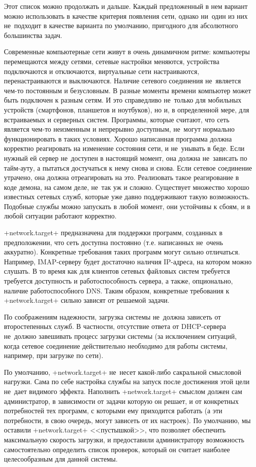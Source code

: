 \documentclass[10pt,oneside,a4paper]{article}
\begin{document}
Этот список можно продолжать и дальше. Каждый предложенный в нем вариант можно
использовать в качестве критерия появления сети, однако ни~один из них
не~подходит в качестве варианта по умолчанию, пригодного для абсолютного
большинства задач.

Современные компьютерные сети живут в очень динамичном ритме: компьютеры
перемещаются между сетями, сетевые настройки меняются, устройства подключаются и
отключаются, виртуальные сети настраиваются, перенастраиваются и выключаются.
Наличие сетевого соединения не~является чем-то постоянным и безусловным. В
разные моменты времени компьютер может быть подключен к разным сетям. И это
справедливо не~только для мобильных устройств (смартфонов, планшетов и
ноутбуков), но и, в определенной мере, для встраиваемых и серверных систем. 
Программы, которые считают, что сеть является чем-то неизменным и непрерывно
доступным, не~могут нормально функционировать в таких условиях. Хорошо
написанная программа должна корректно реагировать на изменение состояния сети, и
не~унывать в беде. Если нужный ей сервер не~доступен в настоящий момент, она
должна не~зависать по тайм-ауту, а пытаться достучаться к нему снова и снова.
Если сетевое соединение утрачено, она должна отреагировать на это. Реализовать
такое реагирование в коде демона, на самом деле, не~так уж и сложно. Существует
множество хорошо известных сетевых служб, которые уже давно поддерживают такую
возможность. Подобные службы можно запускать в любой момент, они устойчивы к
сбоям, и в любой ситуации работают корректно.

+network.target+ предназначена для поддержки программ, созданных в
предположении, что сеть доступна постоянно (т.е. написанных не~очень аккуратно).
Конкретные требования таких программ могут сильно отличаться. Например,
IMAP-серверу будет достаточно наличия IP-адреса, на котором можно слушать. В то
время как для клиентов сетевых файловых систем требуется требуется доступность и
работоспособность сервера, а также, опционально, наличие работоспособного DNS.
Таким образом, конкретные требования к +network.target+ сильно зависят от
решаемой задачи.

По соображениям надежности, загрузка системы не~должна зависеть от второстепенных
служб. В частности, отсутствие ответа от DHCP-сервера не~должно завешивать
процесс загрузки системы (за исключением ситуаций, когда сетевое соединение
действительно необходимо для работы системы, например, при загрузке по сети).

По умолчанию, +network.target+ не~несет какой-либо сакральной смысловой
нагрузки. Сама по себе настройка службы на запуск после достижения этой цели
не~дает видимого эффекта. Наполнить +network.target+ смыслом должен сам
администратор, в зависимости от задачи которую он решает, и от конкретных 
потребностей тех программ, с которыми ему приходится работать (а эти
потребности, в свою очередь, могут зависеть от их настроек). По умолчанию, мы
оставили +network.target+ <<пустышкой>>, что позволяет обеспечить максимальную
скорость загрузки, и предоставили администратору возможность самостоятельно
определить список проверок, который он считает наиболее целесообразным для
данной системы.
\end{document}

